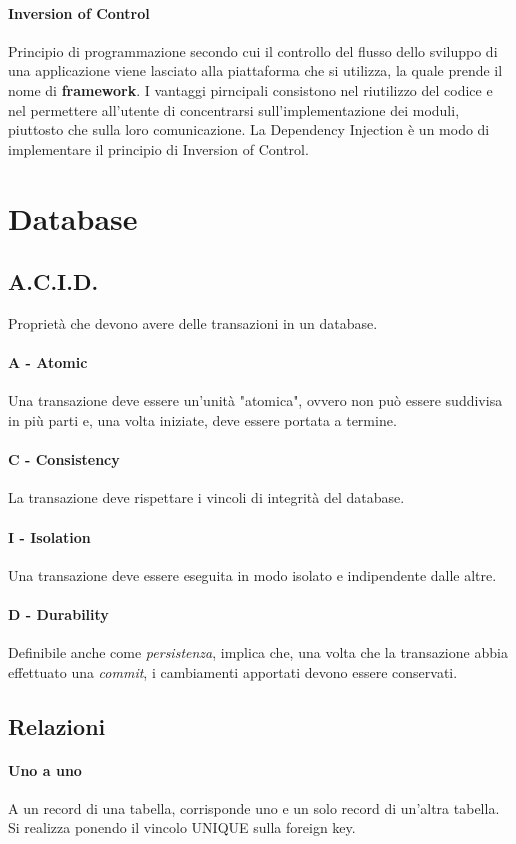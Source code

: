 \documentclass{article}
\begin{document}
        \paragraph{Inversion of Control} Principio di programmazione secondo cui il controllo del flusso dello sviluppo di una applicazione viene lasciato alla piattaforma che si utilizza, la quale prende il nome di \textbf{framework}. I vantaggi pirncipali consistono nel riutilizzo del codice e nel permettere all'utente di concentrarsi sull'implementazione dei moduli, piuttosto che sulla loro comunicazione. La Dependency Injection è un modo di implementare il principio di Inversion of Control.

\section{Database}
    \subsection{A.C.I.D.}
        Proprietà che devono avere delle transazioni in un database.
        \paragraph{A - Atomic} Una transazione deve essere un'unità "atomica", ovvero non può essere suddivisa in più parti e, una volta iniziate, deve essere portata a termine.
        \paragraph{C - Consistency} La transazione deve rispettare i vincoli di integrità del database.
        \paragraph{I - Isolation} Una transazione deve essere eseguita in modo isolato e indipendente dalle altre.
        \paragraph{D - Durability} Definibile anche come \textit{persistenza}, implica che, una volta che la transazione abbia effettuato una \textit{commit}, i cambiamenti apportati devono essere conservati. 
    \subsection{Relazioni}
        \paragraph{Uno a uno} A un record di una tabella, corrisponde uno e un solo record di un'altra tabella. Si realizza ponendo il vincolo UNIQUE sulla foreign key.
\end{document}
